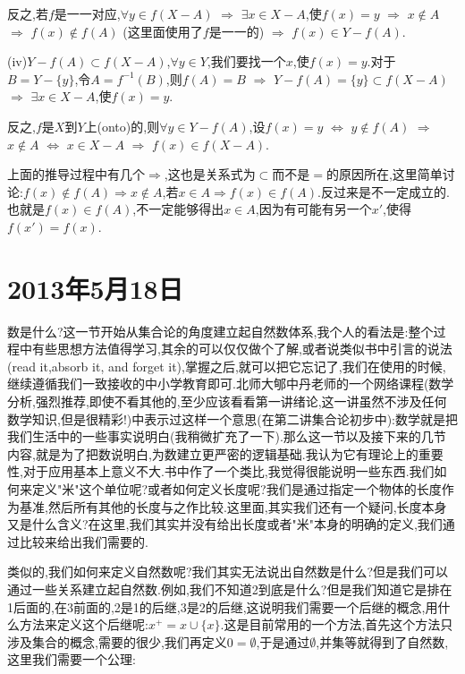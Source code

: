 \documentclass[12pt,a4paper,openany]{book}
\begin{document}
反之,若$f$是一一对应,$\forall y \in f(X-A)$ $\Rightarrow$ $\exists x \in X-A$,使$f(x)=y$ $\Rightarrow$ $x \notin A$ $\Rightarrow$ $f(x) \notin f(A)$ (这里面使用了$f$是一一的) $\Rightarrow$ $f(x) \in Y-f(A)$.

(iv)$Y-f(A) \subset f(X-A)$,$\forall y \in Y$,我们要找一个$x$,使$f(x)=y$.对于$B=Y-\{y\}$,令$A=f^{-1}(B)$,则$f(A)=B$ $\Rightarrow$ $Y-f(A)=\{y\} \subset f(X-A)$ $\Rightarrow$ $\exists x \in X-A$,使$f(x)=y$.

反之,$f$是$X$到$Y$上(onto)的,则$\forall y \in Y-f(A)$,设$f(x)=y$ $\Leftrightarrow$ $y \notin f(A)$ $\Rightarrow$ $x \notin A$ $\Leftrightarrow$ $x \in X-A$ $\Rightarrow$ $f(x) \in f(X-A)$.

上面的推导过程中有几个$\Rightarrow$,这也是关系式为$\subset$而不是$=$的原因所在,这里简单讨论:$f(x) \notin f(A) \Rightarrow x \notin A$,若$x \in A \Rightarrow f(x) \in f(A)$.反过来是不一定成立的.也就是$f(x) \in f(A)$,不一定能够得出$x \in A$,因为有可能有另一个$x'$,使得$f(x')=f(x)$.

\section{2013年5月18日}
数是什么?这一节开始从集合论的角度建立起自然数体系,我个人的看法是:整个过程中有些思想方法值得学习,其余的可以仅仅做个了解,或者说类似书中引言的说法(read it,absorb it, and forget it),掌握之后,就可以把它忘记了,我们在使用的时候,继续遵循我们一致接收的中小学教育即可.北师大郇中丹老师的一个网络课程(数学分析,强烈推荐,即使不看其他的,至少应该看看第一讲绪论,这一讲虽然不涉及任何数学知识,但是很精彩!)中表示过这样一个意思(在第二讲集合论初步中):数学就是把我们生活中的一些事实说明白(我稍微扩充了一下).那么这一节以及接下来的几节内容,就是为了把数说明白,为数建立更严密的逻辑基础.我认为它有理论上的重要性,对于应用基本上意义不大.书中作了一个类比,我觉得很能说明一些东西.我们如何来定义"米"这个单位呢?或者如何定义长度呢?我们是通过指定一个物体的长度作为基准,然后所有其他的长度与之作比较.这里面,其实我们还有一个疑问,长度本身又是什么含义?在这里,我们其实并没有给出长度或者"米"本身的明确的定义,我们通过比较来给出我们需要的.

类似的,我们如何来定义自然数呢?我们其实无法说出自然数是什么?但是我们可以通过一些关系建立起自然数.例如,我们不知道2到底是什么?但是我们知道它是排在1后面的,在3前面的,2是1的后继,3是2的后继,这说明我们需要一个后继的概念,用什么方法来定义这个后继呢:$x^+=x \cup \{x\}$.这是目前常用的一个方法,首先这个方法只涉及集合的概念,需要的很少,我们再定义$0=\emptyset$,于是通过$\emptyset$,并集等就得到了自然数,这里我们需要一个公理:
\end{document}
